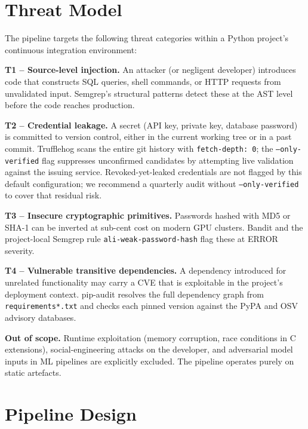 \documentclass[conference]{IEEEtran}
\begin{document}
\section{Threat Model}
\label{sec:threat}

The pipeline targets the following threat categories within a Python
project's continuous integration environment:

\textbf{T1 -- Source-level injection.} An attacker (or negligent developer)
introduces code that constructs SQL queries, shell commands, or HTTP
requests from unvalidated input. Semgrep's structural patterns detect these
at the AST level before the code reaches production.

\textbf{T2 -- Credential leakage.} A secret (API key, private key, database
password) is committed to version control, either in the current working
tree or in a past commit. Trufflehog scans the entire git history with
\texttt{fetch-depth: 0}; the \texttt{--only-verified} flag suppresses
unconfirmed candidates by attempting live validation against the issuing
service. Revoked-yet-leaked credentials are not flagged by this default
configuration; we recommend a quarterly audit without
\texttt{--only-verified} to cover that residual risk.

\textbf{T3 -- Insecure cryptographic primitives.} Passwords hashed with MD5
or SHA-1 can be inverted at sub-cent cost on modern GPU clusters. Bandit
and the project-local Semgrep rule \texttt{ali-weak-password-hash} flag
these at ERROR severity.

\textbf{T4 -- Vulnerable transitive dependencies.} A dependency introduced
for unrelated functionality may carry a CVE that is exploitable in the
project's deployment context. pip-audit resolves the full dependency graph
from \texttt{requirements*.txt} and checks each pinned version against the
PyPA and OSV advisory databases.

\textbf{Out of scope.} Runtime exploitation (memory corruption, race
conditions in C extensions), social-engineering attacks on the developer,
and adversarial model inputs in ML pipelines are explicitly excluded. The
pipeline operates purely on static artefacts.

\section{Pipeline Design}
\label{sec:design}
\end{document}
